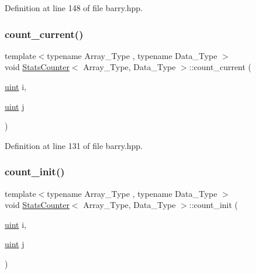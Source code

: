 Definition at line 148 of file barry.\+hpp.

\mbox{\label{classbarry_1_1_stats_counter_ab81166f7cb67eeaecc469016d237019a}} 
\subsubsection{\texorpdfstring{count\+\_\+current()}{count\_current()}}
{\footnotesize\ttfamily template$<$typename Array\+\_\+\+Type , typename Data\+\_\+\+Type $>$ \\
void \hyperlink{classbarry_1_1_stats_counter}{Stats\+Counter}$<$ Array\+\_\+\+Type, Data\+\_\+\+Type $>$\+::count\+\_\+current (\begin{DoxyParamCaption}\item[{\hyperlink{namespacebarry_a11dfc53ddb4672278319aa04f1e09a6c}{uint}}]{i,  }\item[{\hyperlink{namespacebarry_a11dfc53ddb4672278319aa04f1e09a6c}{uint}}]{j }\end{DoxyParamCaption})\hspace{0.3cm}{\ttfamily [inline]}}



Definition at line 131 of file barry.\+hpp.

\mbox{\label{classbarry_1_1_stats_counter_a19bd5936619e190c0d8918b4f343922e}} 
\subsubsection{\texorpdfstring{count\+\_\+init()}{count\_init()}}
{\footnotesize\ttfamily template$<$typename Array\+\_\+\+Type , typename Data\+\_\+\+Type $>$ \\
void \hyperlink{classbarry_1_1_stats_counter}{Stats\+Counter}$<$ Array\+\_\+\+Type, Data\+\_\+\+Type $>$\+::count\+\_\+init (\begin{DoxyParamCaption}\item[{\hyperlink{namespacebarry_a11dfc53ddb4672278319aa04f1e09a6c}{uint}}]{i,  }\item[{\hyperlink{namespacebarry_a11dfc53ddb4672278319aa04f1e09a6c}{uint}}]{j }\end{DoxyParamCaption})\hspace{0.3cm}{\ttfamily [inline]}}



